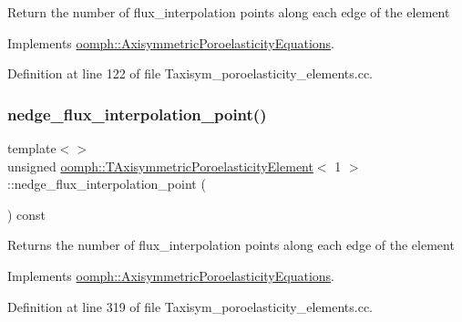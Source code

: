Return the number of flux\+\_\+interpolation points along each edge of the element 

Implements \hyperlink{classoomph_1_1AxisymmetricPoroelasticityEquations_a16d82c2d6bf7f84f6529f4182f83e6ef}{oomph\+::\+Axisymmetric\+Poroelasticity\+Equations}.



Definition at line 122 of file Taxisym\+\_\+poroelasticity\+\_\+elements.\+cc.

\mbox{\label{classoomph_1_1TAxisymmetricPoroelasticityElement_a4352c34520749f27a95a0b0161d3e4a7}} 
\subsubsection{\texorpdfstring{nedge\+\_\+flux\+\_\+interpolation\+\_\+point()}{nedge\_flux\_interpolation\_point()}\hspace{0.1cm}{\footnotesize\ttfamily [2/3]}}
{\footnotesize\ttfamily template$<$$>$ \\
unsigned \hyperlink{classoomph_1_1TAxisymmetricPoroelasticityElement}{oomph\+::\+T\+Axisymmetric\+Poroelasticity\+Element}$<$ 1 $>$\+::nedge\+\_\+flux\+\_\+interpolation\+\_\+point (\begin{DoxyParamCaption}{ }\end{DoxyParamCaption}) const\hspace{0.3cm}{\ttfamily [virtual]}}

Returns the number of flux\+\_\+interpolation points along each edge of the element 

Implements \hyperlink{classoomph_1_1AxisymmetricPoroelasticityEquations_a16d82c2d6bf7f84f6529f4182f83e6ef}{oomph\+::\+Axisymmetric\+Poroelasticity\+Equations}.



Definition at line 319 of file Taxisym\+\_\+poroelasticity\+\_\+elements.\+cc.

\mbox{\label{classoomph_1_1TAxisymmetricPoroelasticityElement_abe8ce45bd70932c365623a1919c69e5d}} 
